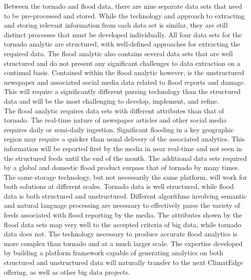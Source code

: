 Between the tornado and flood data, there are nine separate data sets that need to be pre-processed and stored. While the technology and approach to extracting and storing relevant information from each data set is similar, they are still distinct processes that must be developed individually. All four data sets for the tornado analytic are structured, with well-defined approaches for extracting the required data. The flood analytic also contains several data sets that are well structured and do not present any significant challenges to data extraction on a continual basis. Contained within the flood analytic however, is the unstructured newspaper and associated social media data related to flood reports and damage. This will require a significantly different parsing technology than the structured data and will be the most challenging to develop, implement, and refine.\\

The flood analytic requires data sets with different attributes than that of tornado. The real-time nature of newspaper articles and other social media requires daily or semi-daily ingestion. Significant flooding in a key geographic region may require a quicker than usual delivery of the associated analytics. This information will be reported first by the media in near real-time and not seen in the structured feeds until the end of the month. The additional data sets required by a global and domestic flood product surpass that of tornado by many times. The same storage technology, but not necessarily the same platform, will work for both solutions at different scales. Tornado data is well structured, while flood data is both structured and unstructured. Different algorithms involving semantic and natural language processing are necessary to effectively parse the variety of feeds associated with flood reporting by the media. The attributes shown by the flood data sets map very well to the accepted criteria of big data, while tornado data does not. The technology necessary to produce accurate flood analytics is more complex than tornado and at a much larger scale. The expertise developed by building a platform framework capable of generating analytics on both structured and unstructured data will naturally transfer to the next ClimatEdge offering, as well as other big data projects.
